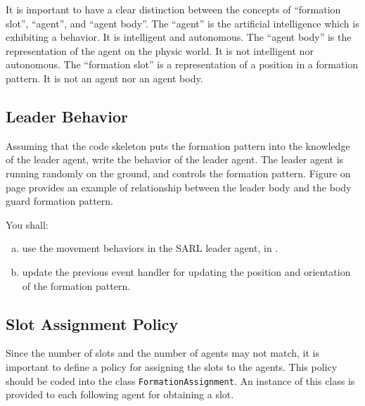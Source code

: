 \documentclass[article,english,nodocumentinfo]{multiagentfrreport}
\begin{document}
\begin{upmcaution}
 It is important to have a clear distinction between the concepts of ``formation slot'', ``agent'', and ``agent body''. \newline\newline
The ``agent'' is the artificial intelligence which is exhibiting a behavior. It is intelligent and autonomous. \newline\newline
The ``agent body'' is the representation of the agent on the physic world. It is not intelligent nor autonomous. \newline\newline
The ``formation slot'' is a representation of a position in a formation pattern. It is not an agent nor an agent body.
\end{upmcaution}

\subsection{Leader Behavior}

Assuming that the code skeleton puts the formation pattern into the knowledge of the leader agent, write the behavior of the leader agent.
The leader agent is running randomly on the ground, and controls the formation pattern.
Figure  on page  provides an example of relationship between the leader body and the body guard formation pattern.


You shall:
\begin{enumerate}[a)]
\item use the movement behaviors in the SARL leader agent, in .
\item update the previous event handler for updating the position and orientation of the formation pattern.
\end{enumerate}

\subsection{Slot Assignment Policy}

Since the number of slots and the number of agents may not match, it is important to define a policy for assigning the slots to the agents.
This policy should be coded into the class \texttt{FormationAssignment}.
An instance of this class is provided to each following agent for obtaining a slot.
\end{document}
